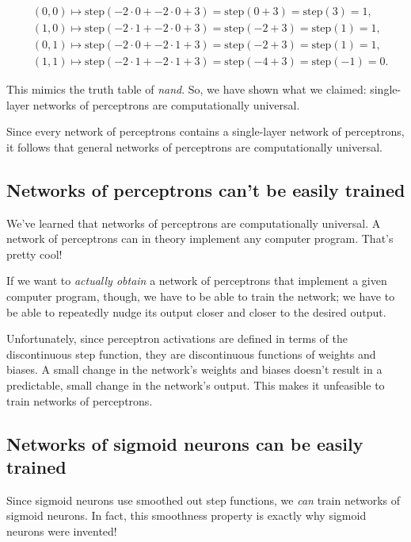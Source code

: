 \documentclass{article}
\begin{document}
	\begin{align*}
		&(0, 0) \mapsto \text{step}(-2 \cdot 0 + -2 \cdot 0 + 3) = \text{step}(0 + 3) = \text{step}(3) = 1, \\
		&(1, 0) \mapsto \text{step}(-2 \cdot 1 + -2 \cdot 0 + 3) = \text{step}(-2 + 3) = \text{step}(1) = 1, \\
		&(0, 1) \mapsto \text{step}(-2 \cdot 0 + -2 \cdot 1 + 3) = \text{step}(-2 + 3) = \text{step}(1) = 1, \\
		&(1, 1) \mapsto \text{step}(-2 \cdot 1 + -2 \cdot 1 + 3) = \text{step}(-4 + 3) = \text{step}(-1) = 0.
	\end{align*}
	
	This mimics the truth table of \textit{nand}. So, we have shown what we claimed: single-layer networks of perceptrons are computationally universal.
	
	Since every network of perceptrons contains a single-layer network of perceptrons, it follows that general networks of perceptrons are computationally universal.
	
	\subsection*{Networks of perceptrons can't be easily trained}
	
	We've learned that networks of perceptrons are computationally universal. A network of perceptrons can in theory implement any computer program. That's pretty cool!
	
	If we want to \textit{actually obtain} a network of perceptrons that implement a given computer program, though, we have to be able to train the network; we have to be able to repeatedly nudge its output closer and closer to the desired output.
	
	Unfortunately, since perceptron activations are defined in terms of the discontinuous step function, they are discontinuous functions of weights and biases. A small change in the network's weights and biases doesn't result in a predictable, small change in the network's output. This makes it unfeasible to train networks of perceptrons.
	
	\subsection*{Networks of sigmoid neurons can be easily trained}
	
	Since sigmoid neurons use smoothed out step functions, we \textit{can} train networks of sigmoid neurons. In fact, this smoothness property is exactly why sigmoid neurons were invented!
	
\end{document}
